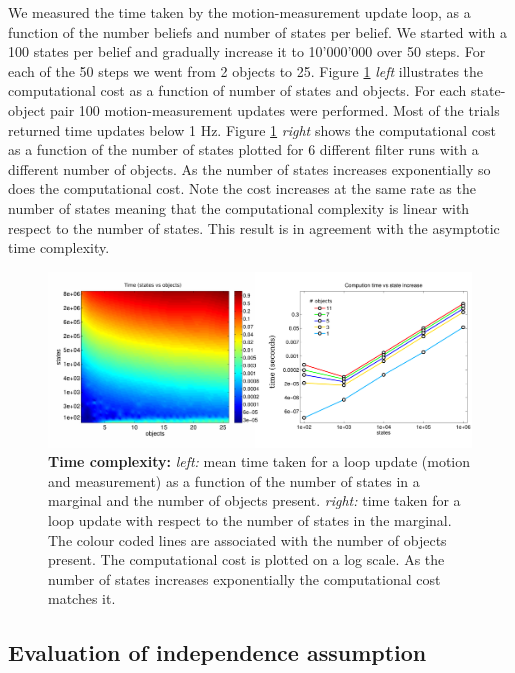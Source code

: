 We measured the time taken by the motion-measurement update loop, as a function of the number beliefs and number of states per belief. 
We started with a 100 states per belief and gradually increase it to 10'000'000 over 50 steps. For each of the 50 steps we went from 2 objects to 25. Figure \ref{fig:time_complexity} \textit{left} illustrates the computational
cost as a function of number of states and objects. For each state-object pair 100 motion-measurement updates were performed. Most of the trials returned time updates 
below 1 Hz. Figure \ref{fig:time_complexity} \textit{right} shows the computational cost as a function of the number of states plotted for 6 different filter runs with
a different number of objects. As the number of states increases exponentially so does the computational cost. Note the cost increases at the same
rate as the number of states meaning that the computational complexity is linear with respect to the number of states. This result is in agreement with 
the asymptotic time complexity.

\begin{figure}
 \includegraphics[width=\textwidth]{./ch5-MLMF/Figures/Figure12_v2.pdf}
 \caption{\textbf{Time complexity:} \textit{left:} mean time taken for a loop update (motion and measurement) as a function of the number of states in a marginal and the 
 number of objects present. \textit{right:} time taken for a loop update with respect to the number of states in the marginal. The colour coded lines are 
 associated with the number of objects present. The computational cost is plotted on a log scale. As the number of states increases exponentially the
 computational cost matches it.}
 \label{fig:time_complexity}
\end{figure}


\subsection{Evaluation of independence assumption}\label{subsec:eval_indep_assumptiom}


